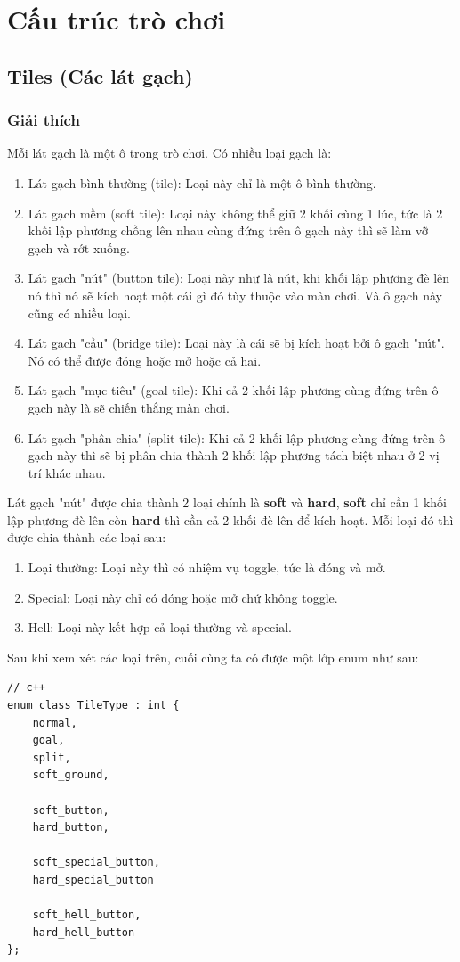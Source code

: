 \documentclass[a4paper, 11pt]{article}
\begin{document}
\section{Cấu trúc trò chơi}
\subsection{Tiles (Các lát gạch)}
\subsubsection{Giải thích}
Mỗi lát gạch là một ô trong trò chơi. Có nhiều loại gạch là:
\begin{enumerate}
	\item Lát gạch bình thường (tile): Loại này chỉ là một ô bình thường.
	\item Lát gạch mềm (soft tile): Loại này không thể giữ 2 khối cùng 1 lúc, tức là 2 khối lập
	      phương chồng lên nhau cùng đứng trên ô gạch này thì sẽ làm vỡ gạch và rớt xuống.
	\item Lát gạch "nút" (button tile): Loại này như là nút, khi khối lập phương đè lên nó thì
	      nó sẽ kích hoạt một cái gì đó tùy thuộc vào màn chơi. Và ô gạch này cũng có nhiều loại.
	\item Lát gạch "cầu" (bridge tile): Loại này là cái sẽ bị kích hoạt bởi ô gạch "nút". Nó có thể
	      được đóng hoặc mở hoặc cả hai.
	\item Lát gạch "mục tiêu" (goal tile): Khi cả 2 khối lập phương cùng đứng trên ô gạch này là
	      sẽ chiến thắng màn chơi.
	\item Lát gạch "phân chia" (split tile): Khi cả 2 khối lập phương cùng đứng trên ô gạch này thì
	      sẽ bị phân chia thành 2 khối lập phương tách biệt nhau ở 2 vị trí khác nhau.
\end{enumerate}
Lát gạch "nút" được chia thành 2 loại chính là \textbf{soft} và \textbf{hard}, \textbf{soft} chỉ cần
1 khối lập phương đè lên còn \textbf{hard} thì cần cả 2 khối đè lên để kích hoạt.
Mỗi loại đó thì được chia thành các loại sau:
\begin{enumerate}
	\item Loại thường: Loại này thì có nhiệm vụ toggle, tức là đóng và mở.
	\item Special: Loại này chỉ có đóng hoặc mở chứ không toggle.
	\item Hell: Loại này kết hợp cả loại thường và special.
\end{enumerate}
Sau khi xem xét các loại trên, cuối cùng ta có được một lớp enum như sau:
\begin{lstlisting}
// c++
enum class TileType : int {
    normal,
    goal,
    split,
    soft_ground,

    soft_button,
    hard_button,

    soft_special_button,
    hard_special_button

    soft_hell_button,
    hard_hell_button
};
\end{lstlisting}
\end{document}

